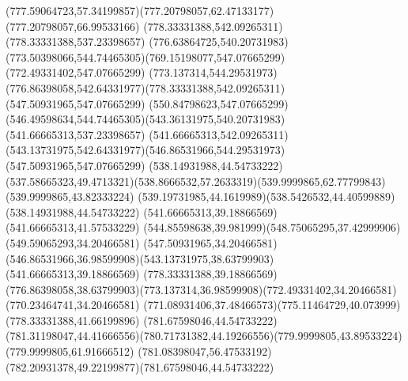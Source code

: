{{	\curveto(777.59064723,57.34199857)(777.20798057,62.47133177)(777.20798057,66.99533166)
	\closepath
	\moveto(778.33331388,542.09265311)
	\lineto(778.33331388,537.23398657)
	\curveto(776.63864725,540.20731983)(773.50398066,544.74465305)(769.15198077,547.07665299)
	\lineto(772.49331402,547.07665299)
	\curveto(773.137314,544.29531973)(776.86398058,542.64331977)(778.33331388,542.09265311)
	\moveto(547.50931965,547.07665299)
	\lineto(550.84798623,547.07665299)
	\curveto(546.49598634,544.74465305)(543.36131975,540.20731983)(541.66665313,537.23398657)
	\lineto(541.66665313,542.09265311)
	\curveto(543.13731975,542.64331977)(546.86531966,544.29531973)(547.50931965,547.07665299)
	\moveto(538.14931988,44.54733222)
	\curveto(537.58665323,49.4713321)(538.8666532,57.2633319)(539.9999865,62.77799843)
	\lineto(539.9999865,43.82333224)
	\curveto(539.19731985,44.1619989)(538.5426532,44.40599889)(538.14931988,44.54733222)
	\moveto(541.66665313,39.18866569)
	\lineto(541.66665313,41.57533229)
	\curveto(544.85598638,39.981999)(548.75065295,37.42999906)(549.59065293,34.20466581)
	\lineto(547.50931965,34.20466581)
	\curveto(546.86531966,36.98599908)(543.13731975,38.63799903)(541.66665313,39.18866569)
	\moveto(778.33331388,39.18866569)
	\curveto(776.86398058,38.63799903)(773.137314,36.98599908)(772.49331402,34.20466581)
	\lineto(770.23464741,34.20466581)
	\curveto(771.08931406,37.48466573)(775.11464729,40.073999)(778.33331388,41.66199896)
	\closepath
	\moveto(781.67598046,44.54733222)
	\curveto(781.31198047,44.41666556)(780.71731382,44.19266556)(779.9999805,43.89533224)
	\lineto(779.9999805,61.91666512)
	\curveto(781.08398047,56.47533192)(782.20931378,49.22199877)(781.67598046,44.54733222)
}
}

